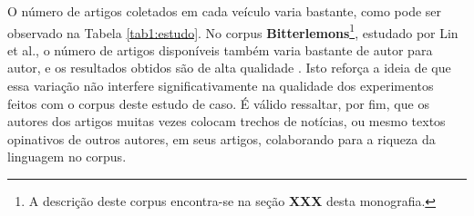 O número de artigos coletados em cada veículo varia bastante, como pode ser observado na Tabela \ref{tab1:estudo}. No corpus \textbf{Bitterlemons}\footnote{A descrição deste corpus encontra-se na seção \textbf{XXX} desta monografia.}, estudado por Lin et al., o número de artigos disponíveis também varia bastante de autor para autor, e os resultados obtidos são de alta qualidade \cite{lin-et-al2006}. Isto reforça a ideia de que essa variação não interfere significativamente na qualidade dos experimentos feitos com o corpus deste estudo de caso. É válido ressaltar, por fim, que os autores dos artigos muitas vezes colocam trechos de notícias, ou mesmo textos opinativos de outros autores, em seus artigos, colaborando para a riqueza da linguagem no corpus.%








